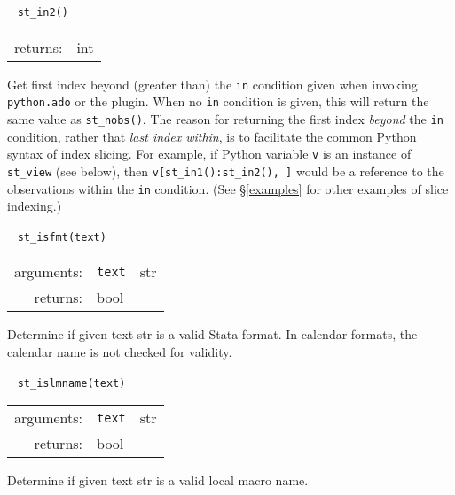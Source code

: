 \documentclass{article}
\begin{document}
			
			\ \newline
			\noindent \lstinline$st_in2()$
								
			\vspace{1.5mm}
			\noindent 
			\indent \begin{tabular}{rl}
					returns: & int
				\end{tabular}
								
			\vspace{1.5mm}
			\noindent Get first index beyond (greater than) the \texttt{in} condition given when invoking \lstinline{python.ado} or the plugin. When no \texttt{in} condition is given, this will return the same value as \lstinline$st_nobs()$. The reason for returning the first index {\em beyond} the \texttt{in} condition, rather that {\em last index within}, is to facilitate the common Python syntax of index slicing. For example, if Python variable \texttt{v} is an instance of \lstinline{st_view} (see below), then \lstinline$v[st_in1():st_in2(), ]$ would be a reference to the observations within the \texttt{in} condition. (See \S\ref{examples} for other examples of slice indexing.) \newline
			
			
			\ \newline
			\noindent \lstinline$st_isfmt(text)$
								
			\vspace{1.5mm}
			\noindent 
			\indent \begin{tabular}{rrl}
					arguments: & \texttt{text} & str \\
					returns: & \multicolumn{2}{l}{bool}
				\end{tabular}
								
			\vspace{1.5mm}
			\noindent Determine if given text str is a valid Stata format. In calendar formats, the calendar name is not checked for validity. \newline
			
			
			\ \newline
			\noindent \lstinline$st_islmname(text)$
								
			\vspace{1.5mm}
			\noindent 
			\indent \begin{tabular}{rrl}
					arguments: & \texttt{text} & str \\
					returns: & \multicolumn{2}{l}{bool}
				\end{tabular}
								
			\vspace{1.5mm}
			\noindent Determine if given text str is a valid local macro name. \newline
			
\end{document}

